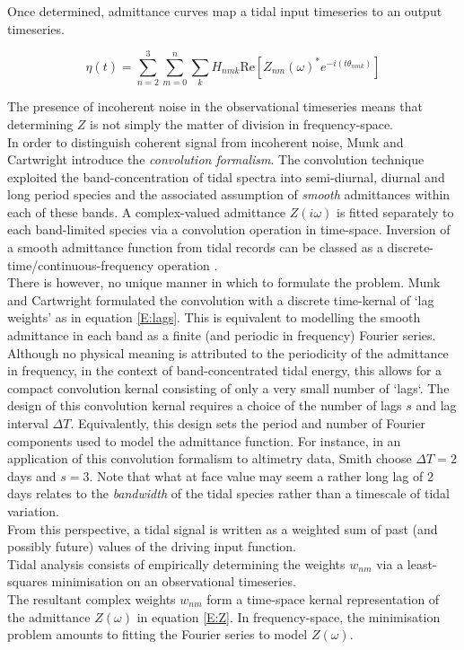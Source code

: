 Once determined, admittance curves map a tidal input timeseries to an output timeseries.

\begin{equation}
\label{E:Z}
\eta(t) = \sum_{n=2}^{3}\sum_{m=0}^{n}\sum_{k} H_{nmk} \text{Re} \left[ Z_{nm}(\omega)^*e^{-i(t\theta_{nmk})} \right] 
\end{equation}


The presence of incoherent noise in the observational timeseries means that determining $Z$ is not simply the matter of division in frequency-space.\\



In order to distinguish coherent signal from incoherent noise, Munk and Cartwright introduce the \emph{convolution formalism}. The convolution technique exploited the band-concentration of tidal spectra into semi-diurnal, diurnal and long period species and the associated assumption of \emph{smooth} admittances within each of these bands.  A complex-valued admittance $Z(i\omega)$ is fitted separately to each band-limited species via a convolution operation in time-space. 
Inversion of a smooth admittance function from tidal records can be classed as a discrete-time/continuous-frequency operation \citep{Percival:1998tw}.\\

There is however, no unique manner in which to formulate the problem.  Munk and Cartwright formulated the convolution with a discrete time-kernal of `lag weights' as in equation \ref{E:lags}.   This is equivalent to modelling the smooth admittance in each band as a finite (and periodic in frequency) Fourier series.   Although no physical meaning is attributed to the periodicity of the admittance in frequency, in the context of band-concentrated tidal energy, this allows for a compact convolution kernal consisting of only a very small number of `lags`.   The design of this convolution kernal requires a choice of the number of lags $s$ and lag interval $\Delta T$.  Equivalently, this design sets the period and number of Fourier components used to model the admittance function.  For instance, in an application of this convolution formalism to altimetry data, Smith \citep{Smith:1997ut} choose $\Delta T=2$ days and $s=3$.   Note that what at face value may seem a rather long lag of 2 days relates to the \emph{bandwidth} of the tidal species rather than a timescale of tidal variation.\\
From this perspective, a tidal signal is written as a weighted sum of past (and possibly future) values of the driving input function.  \\ 
Tidal analysis consists of empirically determining the weights $w_{nm}$ via a least-squares minimisation on an observational timeseries.\\
The resultant complex weights $w_{nm}$ form a time-space kernal representation of the admittance $Z(\omega)$ in equation \ref{E:Z}.   In frequency-space, the minimisation problem amounts to fitting the Fourier series to model $Z(\omega)$.\\


